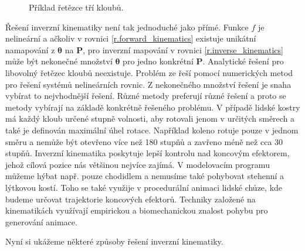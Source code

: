 \begin{figure}[h]
\begin{center}
\caption{Příklad řetězce tří kloubů.} \label{ik_chain}
\end{center}
\end{figure}
Řešení inverzní kinematiky není tak jednoduché jako přímé. Funkce $f$ je nelineární a ačkoliv v rovnici \ref{r.forward_kinematics} existuje unikátní namapování z $\boldsymbol{\theta}$ na $\mathbf{P}$, pro inverzní mapování v rovnici \ref{r.inverse_kinematics} může být nekonečné množství $\boldsymbol{\theta}$ pro jedno konkrétní $\mathbf{P}$. Analytické řešení pro libovolný řetězec kloubů neexistuje. Problém ze řeší pomocí numerických metod pro řešení systémů nelineárních rovnic. Z nekonečného množství řešení je snaha vybírat to nejvhodnější řešení. Různé metody preferují různé řešení a proto se metody vybírají na základě konkrétně řešeného problému. V případě lidské kostry má každý kloub určené stupně volnosti, aby rotovali jenom v určitých směrech a také je definován maximální úhel rotace. Například koleno rotuje pouze v jednom směru a nemůže být otevřeno více než 180 stupňů a zavřeno méně než cca 30 stupňů. Inverzní kinematika poskytuje lepší kontrolu nad koncovým efektorem, jehož cílová pozice nás většinou nejvíce zajímá. V modelovacím programu můžeme hýbat např. pouze chodidlem a nemusíme také pohybovat stehenní a lýtkovou kostí. Toho se také využije v procedurální animaci lidské chůze, kde budeme určovat trajektorie koncových efektorů. Techniky založené na kinematikách využívají empirickou a biomechanickou znalost pohybu pro generování animace. 

Nyní si ukážeme některé způsoby řešení inverzní kinematiky.
